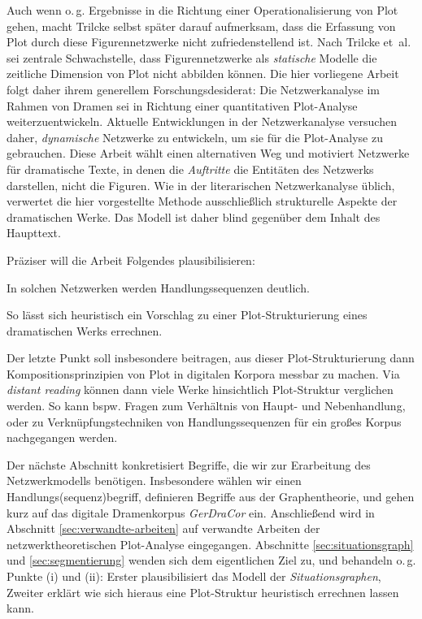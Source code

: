\documentclass[a4paper,10pt,abstract=true,headings=small]{scrartcl}
\newcommand{\eng}[1]{\textenglish{\emph{#1}}}
\begin{document}
Auch wenn o.\,g. Ergebnisse in die Richtung einer Operationalisierung von Plot gehen, macht Trilcke selbst später darauf aufmerksam, dass die Erfassung von Plot durch diese Figurennetzwerke nicht zufriedenstellend ist.
Nach Trilcke et~al. sei zentrale Schwachstelle, dass Figurennetzwerke als \emph{statische} Modelle die zeitliche Dimension von Plot nicht abbilden können.\autocite[Vgl.][176]{trilcke_netzwerkdynamik_2017}
Die hier vorliegene Arbeit folgt daher ihrem generellem Forschungsdesiderat: Die Netzwerkanalyse im Rahmen von Dramen sei in Richtung einer quantitativen Plot-Analyse weiterzuentwickeln.
Aktuelle Entwicklungen in der Netzwerkanalyse versuchen daher, \emph{dynamische} Netzwerke zu entwickeln, um sie für die Plot-Analyse zu gebrauchen.\autocite[Vgl.][176]{trilcke_netzwerkdynamik_2017}
Diese Arbeit wählt einen alternativen Weg und motiviert Netzwerke für dramatische Texte, in denen die \emph{Auftritte} die Entitäten des Netzwerks darstellen, nicht die Figuren.
Wie in der literarischen Netzwerkanalyse üblich, verwertet die hier vorgestellte Methode ausschließlich strukturelle Aspekte der dramatischen Werke.
Das Modell ist daher blind gegenüber dem Inhalt des Haupttext.

Präziser will die Arbeit Folgendes plausibilisieren: 
\begin{enumerate*}
    \item In solchen Netzwerken werden Handlungssequenzen deutlich.
    \item So lässt sich heuristisch ein Vorschlag zu einer Plot-Strukturierung eines dramatischen Werks errechnen.
\end{enumerate*}
Der letzte Punkt soll insbesondere beitragen, aus dieser Plot-Strukturierung dann Kompositionsprinzipien von Plot in digitalen Korpora messbar zu machen.
Via \eng{distant reading} können dann viele Werke hinsichtlich Plot-Struktur verglichen werden.
So kann bspw. Fragen zum Verhältnis von Haupt- und Nebenhandlung, oder zu Verknüpfungstechniken von Handlungssequenzen für ein großes Korpus nachgegangen werden. %



Der nächste Abschnitt konkretisiert Begriffe, die wir zur Erarbeitung des Netzwerkmodells benötigen.
Insbesondere wählen wir einen Handlungs(sequenz)begriff, definieren Begriffe aus der Graphentheorie, und gehen kurz auf das digitale Dramenkorpus \emph{GerDraCor} ein. %
Anschließend wird in Abschnitt \ref{sec:verwandte-arbeiten} auf verwandte Arbeiten der netzwerktheoretischen Plot-Analyse eingegangen.
Abschnitte \ref{sec:situationsgraph} und \ref{sec:segmentierung} wenden sich dem eigentlichen Ziel zu, und behandeln o.\,g. Punkte (i) und (ii): Erster plausibilisiert das Modell der \emph{Situationsgraphen}, Zweiter erklärt wie sich hieraus eine Plot-Struktur heuristisch errechnen lassen kann.
\end{document}
